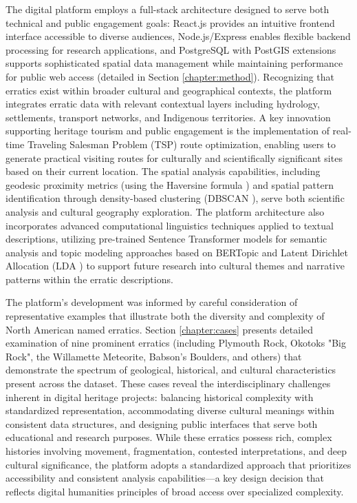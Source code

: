 The digital platform employs a full-stack architecture designed to serve both technical and public engagement goals: React.js provides an intuitive frontend interface accessible to diverse audiences, Node.js/Express enables flexible backend processing for research applications, and PostgreSQL with PostGIS extensions supports sophisticated spatial data management while maintaining performance for public web access (detailed in Section \ref{chapter:method}). Recognizing that erratics exist within broader cultural and geographical contexts, the platform integrates erratic data with relevant contextual layers including hydrology, settlements, transport networks, and Indigenous territories. A key innovation supporting heritage tourism and public engagement is the implementation of real-time Traveling Salesman Problem (TSP) route optimization, enabling users to generate practical visiting routes for culturally and scientifically significant sites based on their current location. The spatial analysis capabilities, including geodesic proximity metrics (using the Haversine formula \cite{Sinnott1984}) and spatial pattern identification through density-based clustering (DBSCAN \cite{Ester1996}), serve both scientific analysis and cultural geography exploration. The platform architecture also incorporates advanced computational linguistics techniques applied to textual descriptions, utilizing pre-trained Sentence Transformer models \cite{Reimers2019} for semantic analysis and topic modeling approaches based on BERTopic \cite{Grootendorst2022} and Latent Dirichlet Allocation (LDA \cite{Blei2003}) to support future research into cultural themes and narrative patterns within the erratic descriptions.

The platform's development was informed by careful consideration of representative examples that illustrate both the diversity and complexity of North American named erratics. Section \ref{chapter:cases} presents detailed examination of nine prominent erratics (including Plymouth Rock, Okotoks "Big Rock", the Willamette Meteorite, Babson's Boulders, and others) that demonstrate the spectrum of geological, historical, and cultural characteristics present across the dataset. These cases reveal the interdisciplinary challenges inherent in digital heritage projects: balancing historical complexity with standardized representation, accommodating diverse cultural meanings within consistent data structures, and designing public interfaces that serve both educational and research purposes. While these erratics possess rich, complex histories involving movement, fragmentation, contested interpretations, and deep cultural significance, the platform adopts a standardized approach that prioritizes accessibility and consistent analysis capabilities—a key design decision that reflects digital humanities principles of broad access over specialized complexity.

